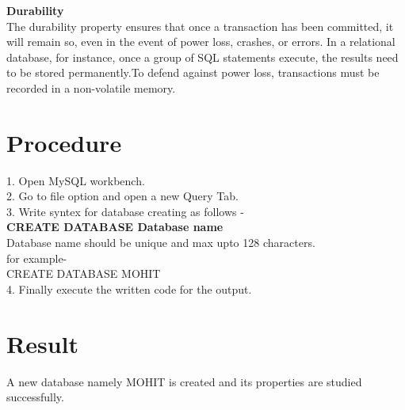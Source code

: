 \documentclass[100pt]{article}
\begin{document}
    \textbf{Durability}\\
    The durability property ensures that once a transaction has been committed, it will remain so, even in the event of power loss, crashes, or errors. In a relational database, for instance, once a group of SQL statements execute, the results need to be stored permanently.To defend against power loss, transactions must be recorded in a non-volatile memory.\\
    
    \section{Procedure}
    1. Open MySQL workbench.\\
    2. Go to file option and open a new Query Tab.\\
    3. Write syntex for database creating as follows - \\
    
      \textbf{ CREATE DATABASE Database name }\\
      
    Database name should be unique and max upto 128 characters.\\
      for example-\\
                     CREATE DATABASE MOHIT\\
    4. Finally execute the written code for the output.  \\
   
    
    
   \section{Result}
   A new database namely MOHIT is created and its properties are studied successfully.
\end{document}
